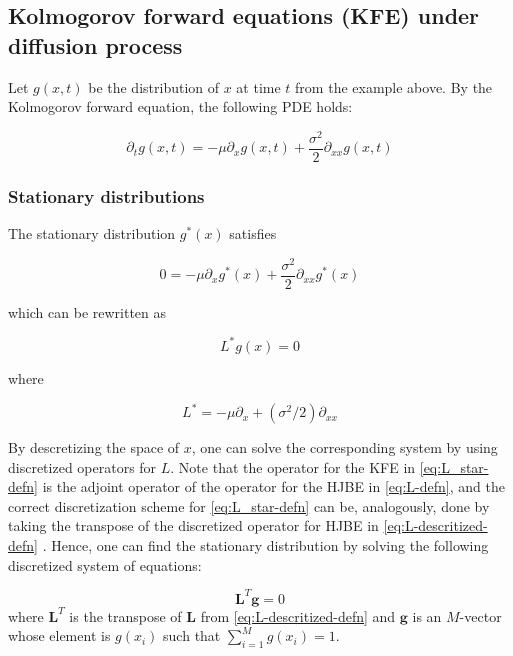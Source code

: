 \documentclass[11pt]{article}
\begin{document}
\subsection{Kolmogorov forward equations (KFE) under diffusion process}
Let $g(x, t)$ be the distribution of $x$ at time $t$ from the example above. By the Kolmogorov forward equation, the following PDE holds:

\begin{equation}\label{eq:kfe}
\partial_{t} g(x, t) = - \mu \partial_{x}  g(x,t) + \dfrac{\sigma^2}{2} \partial_{xx} g(x,t)
\end{equation}

\subsubsection{Stationary distributions}
The stationary distribution $g^*(x)$ satisfies

\begin{equation}\label{eq:kfe-stationary}
0 = - \mu \partial_{x} g^*(x) + \dfrac{\sigma^2}{2} \partial_{xx} g^*(x)
\end{equation}

which can be rewritten as 

\begin{equation}
L^* g(x) = 0
\end{equation}

where 

\begin{equation}\label{eq:L_star-defn}
L^* =  - \mu \partial_{x} + (\sigma^2/2) \partial_{xx}
\end{equation}

By descretizing the space of $x$, one can solve the corresponding system by using discretized operators for $L$. Note that the operator for the KFE in \eqref{eq:L_star-defn} is the adjoint operator of the operator for the HJBE in \eqref{eq:L-defn}, and the correct discretization scheme for \eqref{eq:L_star-defn} can be, analogously, done by taking the transpose of the discretized operator for HJBE in \eqref{eq:L-descritized-defn} \cite{gabaix16}. Hence, one can find the stationary distribution by solving the following discretized system of equations:

\begin{equation}
\mathbf{L}^T \mathbf{g} = 0 
\end{equation}
where $\mathbf{L}^T$ is the transpose of $\mathbf{L}$ from \eqref{eq:L-descritized-defn} and $\mathbf{g}$ is an $M$-vector whose element is $g(x_i)$ such that $\sum_{i=1}^M g(x_i) = 1$.
\end{document}
